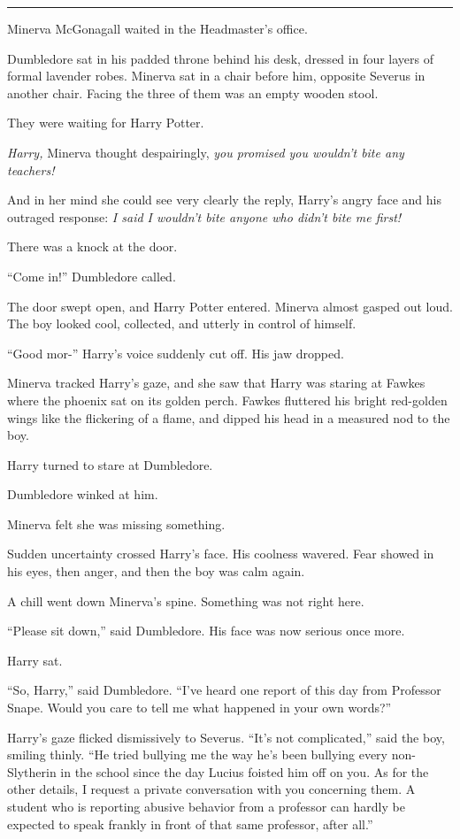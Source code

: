 \begin{center}\rule{3in}{0.4pt}\end{center}

Minerva McGonagall waited in the Headmaster's office.

Dumbledore sat in his padded throne behind his desk, dressed in four
layers of formal lavender robes. Minerva sat in a chair before him,
opposite Severus in another chair. Facing the three of them was an empty
wooden stool.

They were waiting for Harry Potter.

\emph{Harry,} Minerva thought despairingly, \emph{you promised you
wouldn't bite any teachers!}

And in her mind she could see very clearly the reply, Harry's angry face
and his outraged response: \emph{I said I wouldn't bite anyone who
didn't bite me first!}

There was a knock at the door.

``Come in!'' Dumbledore called.

The door swept open, and Harry Potter entered. Minerva almost gasped out
loud. The boy looked cool, collected, and utterly in control of himself.

``Good mor-'' Harry's voice suddenly cut off. His jaw dropped.

Minerva tracked Harry's gaze, and she saw that Harry was staring at
Fawkes where the phoenix sat on its golden perch. Fawkes fluttered his
bright red-golden wings like the flickering of a flame, and dipped his
head in a measured nod to the boy.

Harry turned to stare at Dumbledore.

Dumbledore winked at him.

Minerva felt she was missing something.

Sudden uncertainty crossed Harry's face. His coolness wavered. Fear
showed in his eyes, then anger, and then the boy was calm again.

A chill went down Minerva's spine. Something was not right here.

``Please sit down,'' said Dumbledore. His face was now serious once
more.

Harry sat.

``So, Harry,'' said Dumbledore. ``I've heard one report of this day from
Professor Snape. Would you care to tell me what happened in your own
words?''

Harry's gaze flicked dismissively to Severus. ``It's not complicated,''
said the boy, smiling thinly. ``He tried bullying me the way he's been
bullying every non-Slytherin in the school since the day Lucius foisted
him off on you. As for the other details, I request a private
conversation with you concerning them. A student who is reporting
abusive behavior from a professor can hardly be expected to speak
frankly in front of that same professor, after all.''

